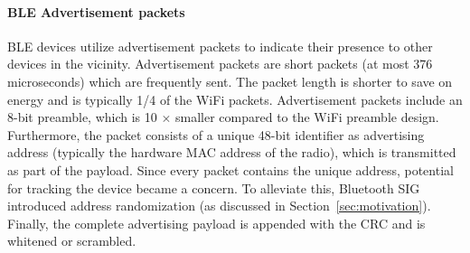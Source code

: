 %

\paragraph{BLE Advertisement packets} BLE devices utilize advertisement packets to indicate their presence to other devices in the vicinity. Advertisement packets are short packets (at most 376 microseconds) which are frequently sent. The packet length is shorter to save on energy and is typically 1/4 of the WiFi packets. Advertisement packets include an 8-bit preamble, which is 10 $\times$ smaller compared to the WiFi preamble design. Furthermore, the packet consists of a unique 48-bit identifier as advertising address (typically the hardware MAC address of the radio), which is transmitted as part of the payload. Since every packet contains the unique address, potential for tracking the device became a concern. To alleviate this, Bluetooth SIG introduced address randomization (as discussed in Section~\ref{sec:motivation}). Finally, the complete advertising payload is appended with the CRC and is whitened or scrambled. 

